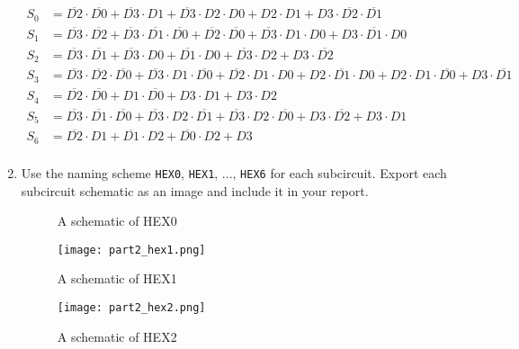 \documentclass{article}
\begin{document}
\begin{enumerate}
\begin{align*}
    S_0 &= \overline{D2} \cdot \overline{D0}+\overline{D3} \cdot D1+\overline{D3}\cdot D2 \cdot D0+D2\cdot D1+D3\cdot \overline{D2}\cdot \overline{D1}\\
    S_1 &= \overline{D3} \cdot \overline{D2}+ \overline{D3} \cdot \overline{D1} \cdot \overline{D0}+\overline{D2} \cdot \overline{D0}+\overline{D3} \cdot D1 \cdot D0+D3 \cdot \overline{D1} \cdot D0\\
    S_2 &= \overline{D3} \cdot \overline{D1}+\overline{D3} \cdot D0+\overline{D1} \cdot D0+\overline{D3} \cdot D2+D3 \cdot \overline{D2}\\
    S_3 &= \overline{D3} \cdot \overline{D2} \cdot \overline{D0}+\overline{D3} \cdot D1 \cdot \overline{D0}+\overline{D2}\cdot D1\cdot D0+D2 \cdot \overline{D1}\cdot D0+D2\cdot D1\cdot \overline{D0}+D3\cdot \overline{D1}\\
    S_4 &= \overline{D2} \cdot \overline{D0}+D1\cdot \overline{D0}+D3 \cdot D1+D3 \cdot D2 \\
    S_5 &= \overline{D3}\cdot \overline{D1}\cdot \overline{D0}+\overline{D3}\cdot D2\cdot \overline{D1}+ \overline{D3}\cdot D2\cdot \overline{D0}+D3\cdot \overline{D2}+D3\cdot D1 \\
    S_6 &= \overline{D2}\cdot D1+\overline{D1}\cdot D2+\overline{D0}\cdot D2+D3\\
\end{align*}

\item Use the naming scheme \verb|HEX0|, \verb|HEX1|, ..., \verb|HEX6| for each subcircuit.
    Export each subcircuit schematic as an image and include it in your report.

\begin{figure}[ht!]
    \centering
    \caption{A schematic of HEX0}
    \label{f:part2_hex0}
\end{figure}

\begin{figure}[ht!]
    \centering
    \texttt{[image: part2\_hex1.png]}
    \caption{A schematic of HEX1}
    \label{f:part2_hex1}
\end{figure}

\begin{figure}[ht!]
    \centering
    \texttt{[image: part2\_hex2.png]}
    \caption{A schematic of HEX2}
    \label{f:part2_hex2}
\end{figure}



\end{enumerate}
\end{document}
